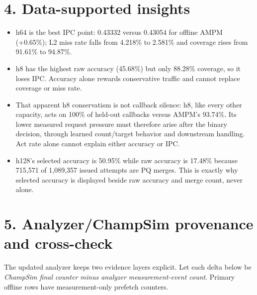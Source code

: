 \documentclass[10pt]{article}
\begin{document}
\section*{4. Data-supported insights}
\begin{infobox}[fontupper=\small]
\begin{itemize}[itemsep=1pt,topsep=1pt]
\item h64 is the best IPC point: 0.43332 versus 0.43054 for offline AMPM (+0.65\%); L2 miss rate falls from 4.218\% to 2.581\% and coverage rises from 91.61\% to 94.87\%.
\item h8 has the highest raw accuracy (45.68\%) but only 88.28\% coverage, so it loses IPC.  Accuracy alone rewards conservative traffic and cannot replace coverage or miss rate.
\item That apparent h8 conservatism is not callback silence: h8, like every
other capacity, acts on 100\% of held-out callbacks versus AMPM's 93.74\%.
Its lower measured request pressure must therefore arise after the binary
decision, through learned count/target behavior and downstream handling.  Act
rate alone cannot explain either accuracy or IPC.
\item h128's selected accuracy is 50.95\% while raw accuracy is 17.48\% because 715,571 of 1,089,357 issued attempts are PQ merges.  This is exactly why selected accuracy is displayed beside raw accuracy and merge count, never alone.
\end{itemize}
\end{infobox}

\clearpage
\section*{5. Analyzer/ChampSim provenance and cross-check}
The updated analyzer keeps two evidence layers explicit.  Let each delta below
be \emph{ChampSim final counter minus analyzer measurement-event count}.
Primary offline rows have measurement-only prefetch counters.

\begin{center}\scriptsize
{}
\end{center}
\end{document}
